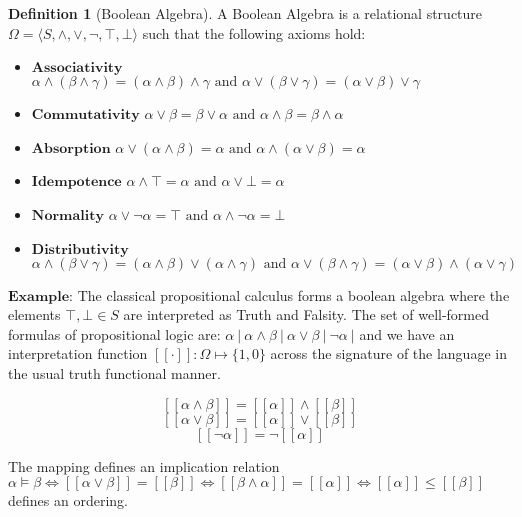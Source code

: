 \documentclass[]{tufte-book}
\theoremstyle{definition}
\newtheorem{definition}{Definition}[chapter]
\theoremstyle{definition}
\theoremstyle{definition}
\theoremstyle{remark}
\begin{document}
\begin{definition}[Boolean Algebra]
\protect\hypertarget{def:unnamed-chunk-15}{}{\label{def:unnamed-chunk-15} \iffalse (Boolean Algebra) \fi{} } A Boolean Algebra is a relational structure \(\Omega = \langle S, \wedge, \vee, \neg, \top, \bot \rangle\) such that the following axioms hold:

\begin{itemize}
\item
  \(\textbf{Associativity }\) \(\alpha \wedge (\beta \wedge \gamma) = (\alpha \wedge \beta) \wedge \gamma \text{      and      } \alpha \vee (\beta \vee \gamma) = (\alpha \vee \beta) \vee \gamma\)
\item
  \(\textbf{Commutativity}\) \(\alpha \vee \beta = \beta \vee \alpha \text{      and      } \alpha \wedge \beta = \beta \wedge \alpha\)
\item
  \(\textbf{Absorption}\) \(\alpha \vee (\alpha \wedge \beta) = \alpha \text{      and      } \alpha \wedge (\alpha \vee \beta) = \alpha\)
\item
  \(\textbf{Idempotence}\) \(\alpha \wedge \top = \alpha \text{      and      } \alpha \vee \bot = \alpha\)
\item
  \(\textbf{Normality}\) \(\alpha \vee \neg\alpha = \top \text{      and      } \alpha \wedge \neg\alpha = \bot\)
\item
  \(\textbf{Distributivity}\) \(\alpha \wedge (\beta \vee \gamma) = (\alpha \wedge \beta) \vee (\alpha \wedge \gamma) \text{      and      } \alpha \vee (\beta \wedge \gamma) = (\alpha \vee \beta) \wedge (\alpha \vee \gamma)\)
\end{itemize}

\(\textbf{Example:}\) The classical propositional calculus forms a boolean algebra where the elements \({\top, \bot \in S}\) are interpreted as Truth and Falsity. The set of well-formed formulas of propositional logic are: \(\alpha \  | \  \alpha \wedge \beta \  | \  \alpha \vee \beta \  | \  \neg\alpha \ |\) and we have an interpretation function \({ [[ \cdot ]] : \Omega \mapsto \{1, 0 \}}\) across the signature of the language in the usual truth functional manner.

\[ [[ \alpha \wedge \beta  ]]  = [[ \alpha  ]] \wedge [[ \beta  ]] \]
\[ [[ \alpha \vee \beta  ]]  = [[ \alpha  ]] \vee [[ \beta  ]] \]
\[ [[ \neg\alpha ]]  = \neg [[ \alpha  ]] \]

The mapping defines an implication relation \(\alpha \models \beta \Leftrightarrow [[ \alpha \vee \beta ]] = [[ \beta ]] \Leftrightarrow [[ \beta \wedge \alpha ]] = [[ \alpha ]] \Leftrightarrow [[ \alpha ]] \leq [[ \beta ]]\) defines an ordering.
\end{definition}
\end{document}
